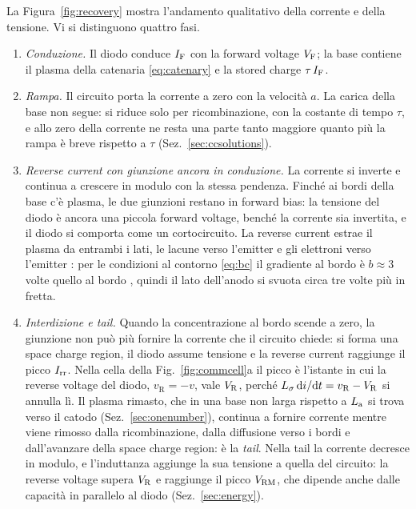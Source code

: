 \documentclass[10pt,a4paper]{scrartcl}
\let\newcommand\pdvaluedefine
\newcommand{\IF}{I_\mathrm{F}}
\newcommand{\VR}{V_\mathrm{R}}
\newcommand{\VF}{V_\mathrm{F}}
\newcommand{\Irr}{I_\mathrm{rr}}
\newcommand{\Vrm}{V_\mathrm{RM}}
\newcommand{\diff}{\mathrm{d}}
\newcommand{\Ls}{L_\sigma}                    %
\newcommand{\La}{L_\mathrm{a}}
\newcommand{\Pp}{p\textsuperscript{+}}
\newcommand{\Nm}{n\textsuperscript{--}}
\newcommand{\Np}{n\textsuperscript{+}}
\begin{document}
La Figura~\ref{fig:recovery} mostra l'andamento qualitativo della corrente e della tensione. Vi si distinguono quattro fasi.
\begin{enumerate}
\item \emph{Conduzione.} Il diodo conduce $\IF$ con la forward voltage $\VF$; la base contiene il plasma della catenaria \eqref{eq:catenary} e la stored charge $\tau\,\IF$.
\item \emph{Rampa.} Il circuito porta la corrente a zero con la velocità $a$. La carica della base non segue: si riduce solo per ricombinazione, con la costante di tempo $\tau$, e allo zero della corrente ne resta una parte tanto maggiore quanto più la rampa è breve rispetto a $\tau$ (Sez.~\ref{sec:ccsolutions}).
\item \emph{Reverse current con giunzione ancora in conduzione.} La corrente si inverte e continua a crescere in modulo con la stessa pendenza. Finché ai bordi della base c'è plasma, le due giunzioni restano in forward bias: la tensione del diodo è ancora una piccola forward voltage, benché la corrente sia invertita, e il diodo si comporta come un cortocircuito. La reverse current estrae il plasma da entrambi i lati, le lacune verso l'emitter \Pp{} e gli elettroni verso l'emitter \Np: per le condizioni al contorno \eqref{eq:bc} il gradiente al bordo \Pp\Nm{} è $b \approx 3$ volte quello al bordo \Nm\Np, quindi il lato dell'anodo si svuota circa tre volte più in fretta.
\item \emph{Interdizione e tail.} Quando la concentrazione al bordo \Pp\Nm{} scende a zero, la giunzione non può più fornire la corrente che il circuito chiede: si forma una space charge region, il diodo assume tensione e la reverse current raggiunge il picco $\Irr$. Nella cella della Fig.~\ref{fig:commcell}a il picco è l'istante in cui la reverse voltage del diodo, $v_\mathrm{R} = -v$, vale $\VR$, perché $\Ls\,\diff i/\diff t = v_\mathrm{R} - \VR$ si annulla lì. Il plasma rimasto, che in una base non larga rispetto a $\La$ si trova verso il catodo (Sez.~\ref{sec:onenumber}), continua a fornire corrente mentre viene rimosso dalla ricombinazione, dalla diffusione verso i bordi e dall'avanzare della space charge region: è la \emph{tail}. Nella tail la corrente decresce in modulo, e l'induttanza aggiunge la sua tensione a quella del circuito: la reverse voltage supera $\VR$ e raggiunge il picco $\Vrm$, che dipende anche dalle capacità in parallelo al diodo (Sez.~\ref{sec:energy}).
\end{enumerate}
\end{document}
